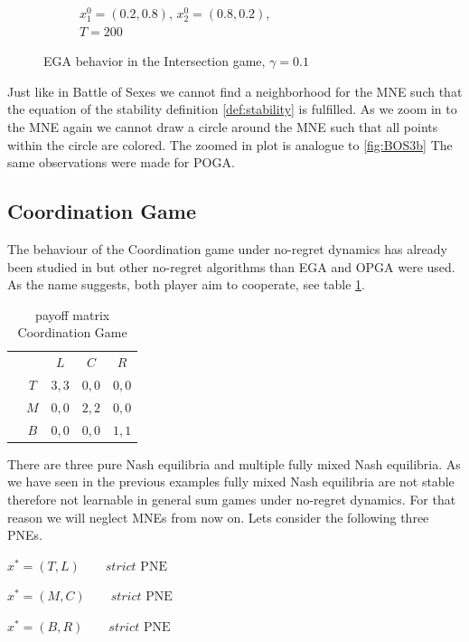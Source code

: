 \begin{figure}[H]
\begin{subfigure}{.5\textwidth}
    \caption{$x_{1}^0 = (0.2,0.8)$, $x_{2}^0 = (0.8,0.2)$, \\ $T = 200$}
    \label{fig:IntersectionGame1b}
\end{subfigure}
\caption{EGA behavior in the Intersection game, $\gamma = 0.1$}
\label{fig:IntersectionGame1}
\end{figure}


Just like in Battle of Sexes we cannot find a neighborhood for the MNE such that the equation of the stability definition \ref{def:stability} is fulfilled. As we zoom in to the MNE again we cannot draw a circle around the MNE such that all points within the circle are colored. The zoomed in plot is analogue to \ref{fig:BOS3b} The same observations were made for POGA. 


\subsection{Coordination Game}\label{subsection:coordinationGame}

The behaviour of the Coordination game under no-regret dynamics has already been studied in \cite{jafari} but other no-regret algorithms than EGA and OPGA were used. As the name suggests, both player aim to cooperate, see table \ref{tab:payoffCoordination3x3}. 

\begin{table}[H]\centering
\setlength{\extrarowheight}{2pt}
\begin{tabular}{cc|c|c|c|}
  & \multicolumn{1}{c}{} & \multicolumn{1}{c}{$L$}  & \multicolumn{1}{c}{$C$}  & \multicolumn{1}{c}{$R$} \\\cline{3-5}
            & $T$ & $3,3$ & $0,0$ & $0,0$ \\ \cline{3-5}
            & $M$ & $0,0$ & $2,2$ & $0,0$ \\\cline{3-5}
            & $B$ & $0,0$ & $0,0$ & $1,1$ \\\cline{3-5}
\end{tabular}\caption{\label{tab:payoffCoordination3x3}payoff matrix Coordination Game}
\end{table}

There are three pure Nash equilibria and multiple fully mixed Nash equilibria. As we have seen in the previous examples fully mixed Nash equilibria are not stable therefore not learnable in general sum games under no-regret dynamics. For that reason we will neglect MNEs from now on. Lets consider the following three PNEs.

\begin{description}\centering
    \item $x^{*} = (T,L) \qquad \textit{strict }\text{PNE}$
    \item $x^{*} = (M,C) \qquad \textit{strict }\text{PNE}$
    \item $x^{*} = (B,R) \qquad \textit{strict }\text{PNE}$
\end{description}

